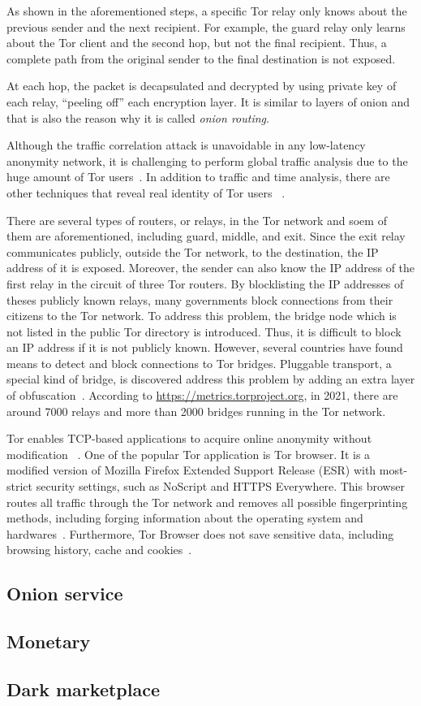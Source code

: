 As shown in the aforementioned steps, a specific Tor relay only knows about the previous
sender and the next recipient. For example, the guard relay only learns about the Tor client
and the second hop, but not the final recipient. Thus, a complete path from the original
sender to the final destination is not exposed.

At each hop, the packet is decapsulated and decrypted by using private key of each relay,
``peeling off'' each encryption layer. It is similar to layers of onion and that is also
the reason why it is called \emph{onion routing}.

Although the traffic correlation attack is unavoidable in any low-latency anonymity
network, it is challenging to perform global traffic analysis due to the huge amount
of Tor users~\cite{dis:anonymity_system,paper:tor_design}. In addition to traffic and
time analysis, there are other techniques that reveal real identity of Tor users
~\cite{paper:de_tor}.

There are several types of routers, or relays, in the Tor network and soem of them
are aforementioned, including guard, middle, and exit. Since the exit relay communicates
publicly, outside the Tor network, to the destination, the IP address of it is exposed.
Moreover, the sender can also know the IP address of the first relay in the circuit of
three Tor routers.
By blocklisting the IP addresses of theses publicly known relays, many governments block
connections from their citizens to the Tor network. To address this problem, the bridge
node which is not listed in the public Tor directory is introduced. Thus, it is difficult
to block an IP address if it is not publicly known. However, several countries have
found means to detect and block connections to Tor bridges. Pluggable transport, a
special kind of bridge, is discovered address this problem by adding an extra layer
of obfuscation~\cite{web:relay_types}. According to \url{https://metrics.torproject.org},
in 2021, there are around 7000 relays and more than 2000 bridges running in the Tor
network.

Tor enables TCP-based applications to acquire online anonymity without modification
~\cite{paper:tor_design}. One of the popular Tor application is Tor browser. It is
a modified version of Mozilla Firefox Extended Support Release (ESR) with most-strict
security settings, such as NoScript and HTTPS Everywhere. This browser routes all
traffic through the Tor network and removes all possible fingerprinting methods,
including forging information about the operating system and hardwares~\cite{dis:usage_of_onion_services}.
Furthermore, Tor Browser does not save sensitive data, including browsing history,
cache and cookies~\cite{dis:usage_of_onion_services}.

\subsection{Onion service}

\subsection{Monetary}

\subsection{Dark marketplace}